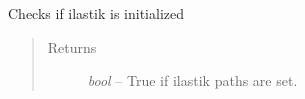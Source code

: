 \documentclass[letterpaper,10pt,english]{sphinxmanual}
\begin{document}

\begin{fulllineitems}
\label{api/ClearMap.ImageProcessing:ClearMap.ImageProcessing.IlastikClassification.checkInitialized}
Checks if ilastik is initialized
\begin{quote}\begin{description}
\item[{Returns}] \leavevmode
\emph{bool} --
True if ilastik paths are set.

\end{description}\end{quote}

\end{fulllineitems}

\end{document}
